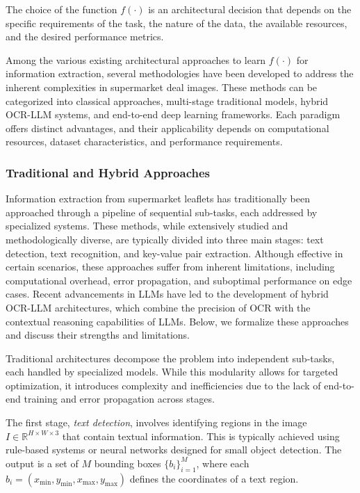 \documentclass[11pt]{article}
\begin{document}
The choice of the function $ f(\cdot) $ is an architectural decision that depends on the specific requirements of the task, the nature of the data, the available resources, and the desired performance metrics. 

Among the various existing architectural approaches to learn $ f(\cdot) $ for information extraction, several methodologies have been developed to address the inherent complexities in supermarket deal images. These methods can be categorized into classical approaches, multi-stage traditional models, hybrid OCR-LLM systems, and end-to-end deep learning frameworks. Each paradigm offers distinct advantages, and their applicability depends on computational resources, dataset characteristics, and performance requirements.

\subsubsection{Traditional and Hybrid Approaches}  
Information extraction from supermarket leaflets has traditionally been approached through a pipeline of sequential sub-tasks, each addressed by specialized systems. These methods, while extensively studied and methodologically diverse, are typically divided into three main stages: text detection, text recognition, and key-value pair extraction. Although effective in certain scenarios, these approaches suffer from inherent limitations, including computational overhead, error propagation, and suboptimal performance on edge cases. Recent advancements in LLMs have led to the development of hybrid OCR-LLM architectures, which combine the precision of OCR with the contextual reasoning capabilities of LLMs. Below, we formalize these approaches and discuss their strengths and limitations.

Traditional architectures decompose the problem into independent sub-tasks, each handled by specialized models. While this modularity allows for targeted optimization, it introduces complexity and inefficiencies due to the lack of end-to-end training and error propagation across stages.

The first stage, \emph{text detection}, involves identifying regions in the image $ I \in \mathbb{R}^{H \times W \times 3} $ that contain textual information. This is typically achieved using rule-based systems or neural networks designed for small object detection. The output is a set of $ M $ bounding boxes $ \{b_i\}_{i=1}^{M} $, where each $ b_i = (x_{\text{min}}, y_{\text{min}}, x_{\text{max}}, y_{\text{max}}) $ defines the coordinates of a text region. 
\end{document}
